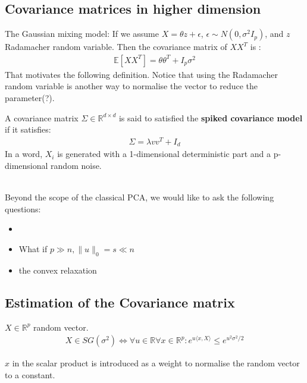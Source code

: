 \subsection{Covariance matrices in higher dimension}
The Gaussian mixing model:
If we assume  $X = \theta z + \epsilon$, $\epsilon \sim N(0, \sigma^2 I_p)$, and $z$ Radamacher random variable. Then the covariance matrix of $XX^T$ is :
\begin{align*}
	\mathbb{E}[XX^T] = \theta \theta^T + I_p \sigma^2
\end{align*}
That motivates the following definition. Notice that using the Radamacher random variable is another way to normalise the vector to reduce the parameter(?).
\begin{definition}
	A covariance matrix $\Sigma \in \mathbb{R}^{d \times d}$ is said to satisfied the \textbf{spiked covariance model} if it satisfies:
	\begin{align*}
		\Sigma = \lambda v v^T + I_d
	\end{align*}
	In a word, $X_i$ is generated with a 1-dimensional deterministic part and a p-dimensional random noise.
\end{definition}
\quad\\
Beyond the scope of the classical PCA, we would like to ask the following questions:
\begin{itemize}
	\item 
	\item What if $p \gg n, \|u\|_0 = s \ll n$
	\item the convex relaxation
\end{itemize}


\subsection{Estimation of the Covariance matrix}
\begin{definition}
$X\in \mathbb{R}^p$ random vector.
\begin{align*}
	X \in SG(\sigma^2) \Leftrightarrow \forall u \in \mathbb{R} \forall x \in \mathbb{R}^p:  e^{u\langle x, X \rangle} \leq e^{u^2 \sigma^2 \slash 2}
\end{align*}
\end{definition}
\begin{remark}
$x$ in the scalar product is introduced as a weight to normalise the random vector to a constant.	
\end{remark}

